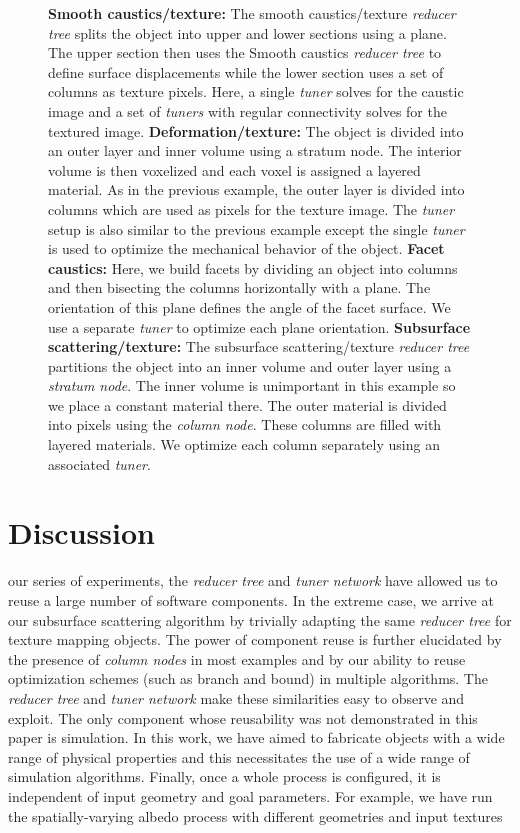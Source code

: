 \begin{figure}[t]
{\textbf{Smooth caustics/texture:} The smooth caustics/texture \emph{reducer tree} splits the object into upper and lower sections using a plane. The upper section then uses the Smooth caustics \emph{reducer tree} to define surface displacements while the lower section uses a set of columns as texture pixels. Here, a single \emph{tuner} solves for the caustic image and a set of \emph{tuners} with regular connectivity solves for the textured image.  \textbf{Deformation/texture:} The object is divided into an outer layer and inner volume using a stratum node. The interior volume is then voxelized and each voxel is assigned a layered material. As in the previous example, the outer layer is divided into columns which are used as pixels for the texture image. The \emph{tuner} setup is also similar to the previous example except the single \emph{tuner} is used to optimize the mechanical behavior of the object. \textbf{Facet caustics:} Here, we build facets by dividing an object into columns and then bisecting the columns horizontally with a plane. The orientation of this plane defines the angle of the facet surface. We use a separate \emph{tuner} to optimize each plane orientation.
\textbf{Subsurface scattering/texture:} The subsurface scattering/texture \emph{reducer tree} partitions the object into an inner volume and outer layer using a \emph{stratum node}. The inner volume is unimportant in this example so we place a constant material there. The outer material is divided into pixels using the \emph{column node}. These columns are filled with layered materials. We optimize each column separately using an associated \emph{tuner}. }
\label{fig:ReducerTreesAdditional}
\end{figure}


\chapter{Discussion}
 our series of experiments, the \emph{reducer tree} and \emph{tuner network} have allowed us to reuse a large number of software components.
In the extreme case, we arrive at our subsurface scattering algorithm by trivially adapting the same \emph{reducer tree} for texture mapping objects.
The power of component reuse is further elucidated by the presence of \emph{column nodes} in most examples and by our ability to reuse optimization schemes (such as branch and bound) in multiple algorithms.
The \emph{reducer tree} and \emph{tuner network} make these similarities easy to observe and exploit.
The only component whose reusability was not demonstrated in this paper is simulation.
In this work, we have aimed to fabricate objects with a wide range of physical properties and this necessitates the use of a wide range of simulation algorithms. Finally, once a whole process is configured, it is independent of input geometry and goal parameters. For example, we have run the spatially-varying albedo process with different geometries and input textures


